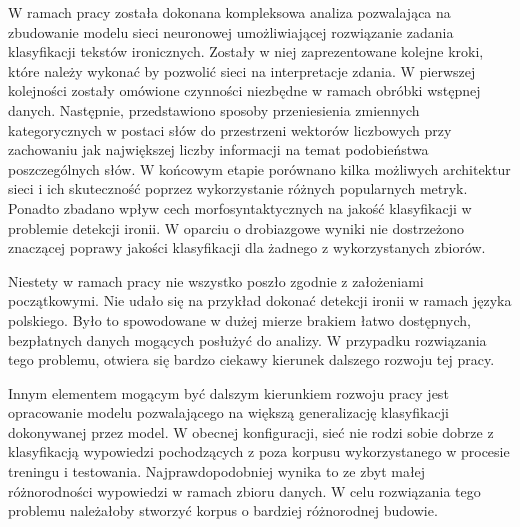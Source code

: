 
W ramach pracy została dokonana kompleksowa analiza pozwalająca na zbudowanie modelu sieci neuronowej umożliwiającej rozwiązanie zadania klasyfikacji tekstów ironicznych. Zostały w niej zaprezentowane kolejne kroki, które należy wykonać by pozwolić sieci na interpretacje zdania. W pierwszej kolejności zostały omówione czynności niezbędne w ramach obróbki wstępnej danych. Następnie, przedstawiono sposoby przeniesienia zmiennych kategorycznych w postaci słów do przestrzeni wektorów liczbowych przy zachowaniu jak największej liczby informacji na temat podobieństwa poszczególnych słów. W końcowym etapie porównano kilka możliwych architektur sieci i ich skuteczność poprzez wykorzystanie różnych popularnych metryk. Ponadto zbadano wpływ cech morfosyntaktycznych na jakość klasyfikacji w problemie detekcji ironii. W oparciu o drobiazgowe wyniki nie dostrzeżono znaczącej poprawy jakości klasyfikacji dla żadnego z wykorzystanych zbiorów. 

Niestety w ramach pracy nie wszystko poszło zgodnie z założeniami początkowymi. Nie udało się na przykład dokonać detekcji ironii w ramach języka polskiego. Było to spowodowane w dużej mierze brakiem łatwo dostępnych, bezpłatnych danych mogących posłużyć do analizy. W przypadku rozwiązania tego problemu, otwiera się bardzo ciekawy kierunek dalszego rozwoju tej pracy. 

Innym elementem mogącym być dalszym kierunkiem rozwoju pracy jest opracowanie modelu pozwalającego na większą generalizację klasyfikacji dokonywanej przez model. W obecnej konfiguracji, sieć nie rodzi sobie dobrze z klasyfikacją wypowiedzi pochodzących z poza korpusu wykorzystanego w procesie treningu i testowania. Najprawdopodobniej wynika to ze zbyt małej różnorodności wypowiedzi w ramach zbioru danych. W celu rozwiązania tego problemu należałoby stworzyć korpus o bardziej różnorodnej budowie. 
